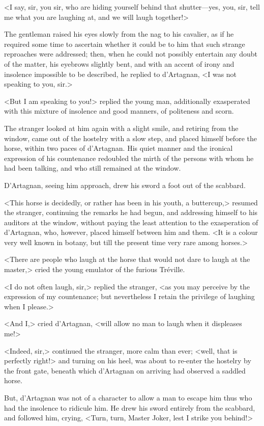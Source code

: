 <I say, sir, you sir, who are hiding yourself behind that shutter---yes, you, sir, tell me what you are laughing at, and we will laugh together!> 

The gentleman raised his eyes slowly from the nag to his cavalier, as if he required some time to ascertain whether it could be to him that such strange reproaches were addressed; then, when he could not possibly entertain any doubt of the matter, his eyebrows slightly bent, and with an accent of irony and insolence impossible to be described, he replied to d'Artagnan, <I was not speaking to you, sir.> 

<But I am speaking to you!> replied the young man, additionally exasperated with this mixture of insolence and good manners, of politeness and scorn. 

The stranger looked at him again with a slight smile, and retiring from the window, came out of the hostelry with a slow step, and placed himself before the horse, within two paces of d'Artagnan. His quiet manner and the ironical expression of his countenance redoubled the mirth of the persons with whom he had been talking, and who still remained at the window. 

D'Artagnan, seeing him approach, drew his sword a foot out of the scabbard. 

<This horse is decidedly, or rather has been in his youth, a buttercup,> resumed the stranger, continuing the remarks he had begun, and addressing himself to his auditors at the window, without paying the least attention to the exasperation of d'Artagnan, who, however, placed himself between him and them. <It is a colour very well known in botany, but till the present time very rare among horses.> 

<There are people who laugh at the horse that would not dare to laugh at the master,> cried the young emulator of the furious Tréville. 

<I do not often laugh, sir,> replied the stranger, <as you may perceive by the expression of my countenance; but nevertheless I retain the privilege of laughing when I please.> 

<And I,> cried d'Artagnan, <will allow no man to laugh when it displeases me!> 

<Indeed, sir,> continued the stranger, more calm than ever; <well, that is perfectly right!> and turning on his heel, was about to re-enter the hostelry by the front gate, beneath which d'Artagnan on arriving had observed a saddled horse. 

But, d'Artagnan was not of a character to allow a man to escape him thus who had the insolence to ridicule him. He drew his sword entirely from the scabbard, and followed him, crying, <Turn, turn, Master Joker, lest I strike you behind!> 

